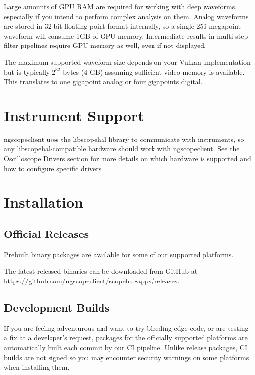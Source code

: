 Large amounts of GPU RAM are required for working with deep waveforms, especially if you intend to perform
complex analysis on them. Analog waveforms are stored in 32-bit floating point format internally, so a single 256
megapoint waveform will consume 1GB of GPU memory. Intermediate results in multi-step filter pipelines require GPU
memory as well, even if not displayed.

The maximum supported waveform size depends on your Vulkan implementation but is typically $2^{32}$ bytes (4 GB) assuming
sufficient video memory is available. This translates to one gigapoint analog or four gigapoints digital.

\section{Instrument Support}

ngscopeclient uses the libscopehal library to communicate with instruments, so any libscopehal-compatible hardware
should work with ngscopeclient. See the \hyperref[sec:scope-drivers]{Oscilloscope Drivers} section for more details on
which hardware is supported and how to configure specific drivers.

\section{Installation}

\subsection{Official Releases}

Prebuilt binary packages are available for some of our supported platforms.

The latest released binaries can be downloaded from GitHub at \url{https://github.com/ngscopeclient/scopehal-apps/releases}.

\subsection{Development Builds}

If you are feeling adventurous and want to try bleeding-edge code, or are testing a fix at a developer's request,
packages for the officially supported platforms are automatically built each commit by our CI pipeline. Unlike release
packages, CI builds are not signed so you may encounter security warnings on some platforms when installing them.

